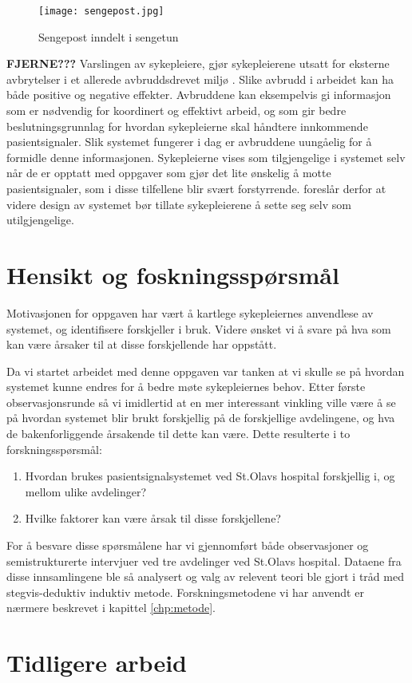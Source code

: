 \begin{figure}[H]
\centering
\texttt{[image: sengepost.jpg]}
\caption{Sengepost inndelt i sengetun \citep{Aslaksen}}
\label{fig:sengepost}
\end{figure}

\noindent
\textbf{FJERNE???} Varslingen av sykepleiere, gjør sykepleierene utsatt for eksterne avbrytelser i et allerede avbruddsdrevet miljø \citep{Klemets12}. Slike avbrudd i arbeidet kan ha både positive og negative effekter. Avbruddene kan eksempelvis gi informasjon som er nødvendig for koordinert og effektivt arbeid, og som gir bedre beslutningsgrunnlag for hvordan sykepleierne skal håndtere innkommende pasientsignaler. Slik systemet fungerer i dag er avbruddene uungåelig for å formidle denne informasjonen.
Sykepleierne vises som tilgjengelige i systemet selv når de er opptatt med oppgaver som gjør det lite ønskelig å motte pasientsignaler, som i disse tilfellene blir svært forstyrrende. \citet{KlemetsRedundancy} foreslår derfor at videre design av systemet bør tillate sykepleierene å sette seg selv som utilgjengelige. 

\section{Hensikt og foskningsspørsmål}
Motivasjonen for oppgaven har vært å kartlege sykepleiernes anvendlese av systemet, og identifisere forskjeller i bruk. Videre ønsket vi å svare på hva som kan være årsaker til at disse forskjellende har oppstått. 

\noindent
Da vi startet arbeidet med denne oppgaven var tanken at vi skulle se på hvordan systemet kunne endres for å bedre møte sykepleiernes behov. Etter første observasjonsrunde så vi imidlertid at en mer interessant vinkling ville være å se på hvordan systemet blir brukt forskjellig på de forskjellige avdelingene, og hva de bakenforliggende årsakende til dette kan være. Dette resulterte i to forskningsspørsmål:

\begin{enumerate}
\item Hvordan brukes pasientsignalsystemet ved St.Olavs hospital forskjellig i, og mellom ulike avdelinger? 
\item Hvilke faktorer kan være årsak til disse forskjellene?
\end{enumerate}

\noindent
For å besvare disse spørsmålene har vi gjennomført både observasjoner og semistrukturerte intervjuer ved tre avdelinger ved St.Olavs hospital. Dataene fra disse innsamlingene ble så analysert og valg av relevent teori ble gjort i tråd med stegvis-deduktiv induktiv metode. Forskningsmetodene vi har anvendt er nærmere beskrevet i kapittel \ref{chp:metode}.

\section{Tidligere arbeid}